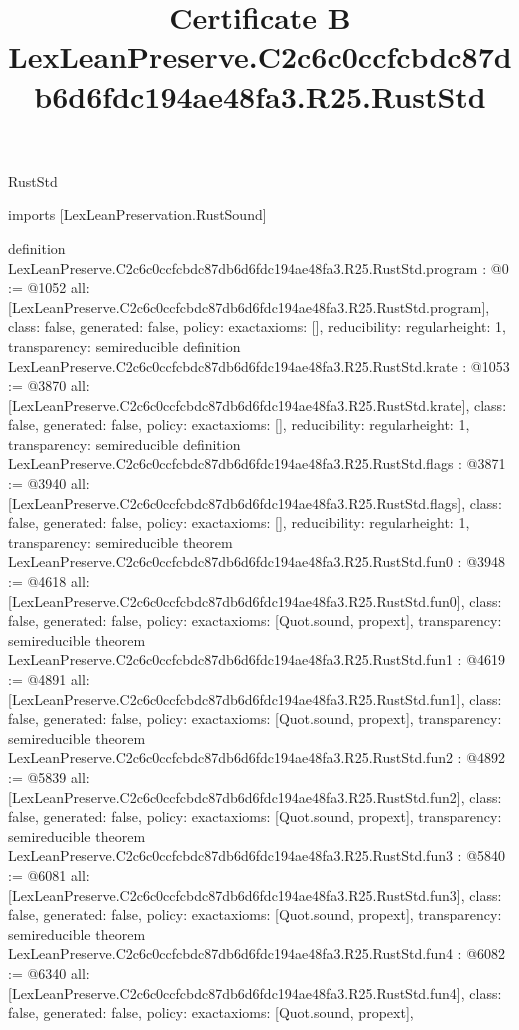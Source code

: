 \begin{lexlean}{RustStd}
\title{Certificate B LexLeanPreserve.C2c6c0ccfcbdc87db6d6fdc194ae48fa3.R25.RustStd}
\begin{coremodule}
imports [LexLeanPreservation.RustSound]

definition LexLeanPreserve.C2c6c0ccfcbdc87db6d6fdc194ae48fa3.R25.RustStd.program : @0 := @1052 {
  all: [LexLeanPreserve.C2c6c0ccfcbdc87db6d6fdc194ae48fa3.R25.RustStd.program],
  class: false,
  generated: false,
  policy: exact{axioms: []},
  reducibility: regular{height: 1},
  transparency: semireducible
}
definition LexLeanPreserve.C2c6c0ccfcbdc87db6d6fdc194ae48fa3.R25.RustStd.krate : @1053 := @3870 {
  all: [LexLeanPreserve.C2c6c0ccfcbdc87db6d6fdc194ae48fa3.R25.RustStd.krate],
  class: false,
  generated: false,
  policy: exact{axioms: []},
  reducibility: regular{height: 1},
  transparency: semireducible
}
definition LexLeanPreserve.C2c6c0ccfcbdc87db6d6fdc194ae48fa3.R25.RustStd.flags : @3871 := @3940 {
  all: [LexLeanPreserve.C2c6c0ccfcbdc87db6d6fdc194ae48fa3.R25.RustStd.flags],
  class: false,
  generated: false,
  policy: exact{axioms: []},
  reducibility: regular{height: 1},
  transparency: semireducible
}
theorem LexLeanPreserve.C2c6c0ccfcbdc87db6d6fdc194ae48fa3.R25.RustStd.fun0 : @3948 := @4618 {
  all: [LexLeanPreserve.C2c6c0ccfcbdc87db6d6fdc194ae48fa3.R25.RustStd.fun0],
  class: false,
  generated: false,
  policy: exact{axioms: [Quot.sound, propext]},
  transparency: semireducible
}
theorem LexLeanPreserve.C2c6c0ccfcbdc87db6d6fdc194ae48fa3.R25.RustStd.fun1 : @4619 := @4891 {
  all: [LexLeanPreserve.C2c6c0ccfcbdc87db6d6fdc194ae48fa3.R25.RustStd.fun1],
  class: false,
  generated: false,
  policy: exact{axioms: [Quot.sound, propext]},
  transparency: semireducible
}
theorem LexLeanPreserve.C2c6c0ccfcbdc87db6d6fdc194ae48fa3.R25.RustStd.fun2 : @4892 := @5839 {
  all: [LexLeanPreserve.C2c6c0ccfcbdc87db6d6fdc194ae48fa3.R25.RustStd.fun2],
  class: false,
  generated: false,
  policy: exact{axioms: [Quot.sound, propext]},
  transparency: semireducible
}
theorem LexLeanPreserve.C2c6c0ccfcbdc87db6d6fdc194ae48fa3.R25.RustStd.fun3 : @5840 := @6081 {
  all: [LexLeanPreserve.C2c6c0ccfcbdc87db6d6fdc194ae48fa3.R25.RustStd.fun3],
  class: false,
  generated: false,
  policy: exact{axioms: [Quot.sound, propext]},
  transparency: semireducible
}
theorem LexLeanPreserve.C2c6c0ccfcbdc87db6d6fdc194ae48fa3.R25.RustStd.fun4 : @6082 := @6340 {
  all: [LexLeanPreserve.C2c6c0ccfcbdc87db6d6fdc194ae48fa3.R25.RustStd.fun4],
  class: false,
  generated: false,
  policy: exact{axioms: [Quot.sound, propext]},
}
\end{coremodule}
\end{lexlean}
